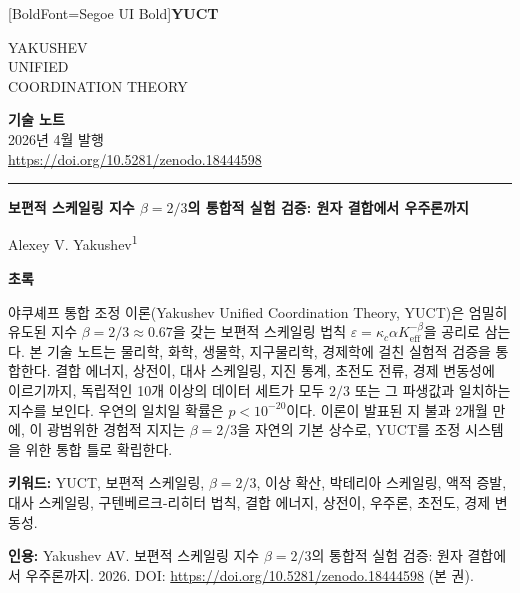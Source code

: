 \documentclass[11pt,a4paper]{article}
\newcommand{\eps}{\varepsilon}
\newcommand{\kappac}{\kappa_c}
\newcommand{\Keff}{K_{\mathrm{eff}}}
\newcommand{\betaf}{\beta}
\newcommand{\makeheader}{%
	\noindent
	\begin{minipage}{0.17\textwidth}
		\raggedright
		{\fontspec{Segoe UI}[BoldFont=Segoe UI Bold]\bfseries\color{skyblue}\fontsize{46}{46}\selectfont YUCT}%
	\end{minipage}%
	\hspace{30pt}
	\begin{minipage}{0.32\textwidth}
		\raggedright
		{\sffamily\fontsize{11}{13}\selectfont YAKUSHEV\\ UNIFIED\\ COORDINATION THEORY}%
	\end{minipage}%
	\hfill
	\begin{minipage}{0.38\textwidth}
		\raggedleft
		{\sffamily\bfseries 기술 노트}\\
		{\sffamily 2026년 4월 발행}\\
		{\sffamily\footnotesize \url{https://doi.org/10.5281/zenodo.18444598}}%
	\end{minipage}
	\par\vspace{5pt}
	\noindent\textcolor{gold}{\rule{\textwidth}{1.6pt}}
	\par\vspace{0pt}
}
\begin{document}
	\thispagestyle{firstpage}
	\makeheader
	
	\vspace{0cm}
	{\LARGE\bfseries 보편적 스케일링 지수 \(\betaf = 2/3\)의 통합적 실험 검증: 원자 결합에서 우주론까지 \par}
	\vspace{0.2cm}
	
	{\large Alexey V. Yakushev\textsuperscript{1}} \\
	\vspace{0.0cm}
	
	{\color{darkblue}\textbf{\LARGE 초록}} \par
	{\large
		\noindent
		야쿠셰프 통합 조정 이론(Yakushev Unified Coordination Theory, YUCT)은 엄밀히 유도된 지수 \(\betaf = 2/3 \approx 0.67\)을 갖는 보편적 스케일링 법칙 \(\eps = \kappac \alpha \Keff^{-\betaf}\)을 공리로 삼는다. 본 기술 노트는 물리학, 화학, 생물학, 지구물리학, 경제학에 걸친 실험적 검증을 통합한다. 결합 에너지, 상전이, 대사 스케일링, 지진 통계, 초전도 전류, 경제 변동성에 이르기까지, 독립적인 10개 이상의 데이터 세트가 모두 \(2/3\) 또는 그 파생값과 일치하는 지수를 보인다. 우연의 일치일 확률은 \(p < 10^{-20}\)이다. 이론이 발표된 지 불과 2개월 만에, 이 광범위한 경험적 지지는 \(\betaf = 2/3\)을 자연의 기본 상수로, YUCT를 조정 시스템을 위한 통합 틀로 확립한다.}
	
	\vspace{0.1cm}
	\noindent
	{\color{darkblue}\textbf{키워드:}} YUCT, 보편적 스케일링, \(\beta = 2/3\), 이상 확산, 박테리아 스케일링, 액적 증발, 대사 스케일링, 구텐베르크-리히터 법칙, 결합 에너지, 상전이, 우주론, 초전도, 경제 변동성.
	
	\vspace{0.1cm}
	\noindent
	{\color{darkblue}\textbf{인용:}} Yakushev AV. 보편적 스케일링 지수 \(\beta = 2/3\)의 통합적 실험 검증: 원자 결합에서 우주론까지. 2026. DOI: \url{https://doi.org/10.5281/zenodo.18444598} (본 권).
	
\end{document}
